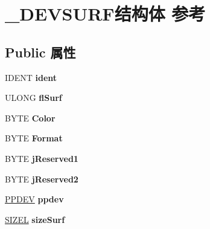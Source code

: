 \hypertarget{struct___d_e_v_s_u_r_f}{}\section{\+\_\+\+D\+E\+V\+S\+U\+R\+F结构体 参考}
\label{struct___d_e_v_s_u_r_f}
\subsection*{Public 属性}
\begin{DoxyCompactItemize}
\item 
\mbox{\label{struct___d_e_v_s_u_r_f_afb2cea2fe412ab2a273c1c10d7b37f96}} 
I\+D\+E\+NT {\bfseries ident}
\item 
\mbox{\label{struct___d_e_v_s_u_r_f_aef3f22ff6361480cc5e97b096b60ffb0}} 
U\+L\+O\+NG {\bfseries fl\+Surf}
\item 
\mbox{\label{struct___d_e_v_s_u_r_f_a66e2d1e2d77f77310aed85eec67f47e4}} 
B\+Y\+TE {\bfseries Color}
\item 
\mbox{\label{struct___d_e_v_s_u_r_f_aa3c9c82d38438a932d30d9fde563869f}} 
B\+Y\+TE {\bfseries Format}
\item 
\mbox{\label{struct___d_e_v_s_u_r_f_ad963118711b7a9afd09618249fb03ffb}} 
B\+Y\+TE {\bfseries j\+Reserved1}
\item 
\mbox{\label{struct___d_e_v_s_u_r_f_a0eda2a515072d691e467aa62bc60df70}} 
B\+Y\+TE {\bfseries j\+Reserved2}
\item 
\mbox{\label{struct___d_e_v_s_u_r_f_a2d2f8cb20f3450dc3dcf20eb0818fb4e}} 
\hyperlink{struct___p_d_e_v}{P\+P\+D\+EV} {\bfseries ppdev}
\item 
\mbox{\label{struct___d_e_v_s_u_r_f_ac716fa4fee0ace9a2986f18ec86e4a2e}} 
\hyperlink{structtag_s_i_z_e}{S\+I\+Z\+EL} {\bfseries size\+Surf}
\item 
\mbox{\label{struct___d_e_v_s_u_r_f_a20e9c7190b14f62eae10a9be5f36626d}} 

\end{DoxyCompactItemize}

